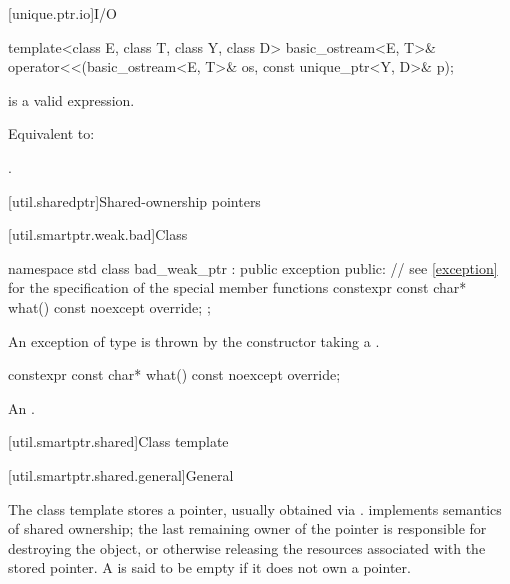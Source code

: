 [unique.ptr.io]{I/O}

%
\begin{itemdecl}
template<class E, class T, class Y, class D>
  basic_ostream<E, T>& operator<<(basic_ostream<E, T>& os, const unique_ptr<Y, D>& p);
\end{itemdecl}

\begin{itemdescr}
\pnum
\constraints
{} is a valid expression.

\pnum
\effects
Equivalent to: 

\pnum
\returns
{}.
\end{itemdescr}

[util.sharedptr]{Shared-ownership pointers}

[util.smartptr.weak.bad]{Class }%
%

%
\begin{codeblock}
namespace std {
  class bad_weak_ptr : public exception {
  public:
    // see \ref{exception} for the specification of the special member functions
    constexpr const char* what() const noexcept override;
  };
}
\end{codeblock}

\pnum
An exception of type  is thrown by the 
constructor taking a .

%
\begin{itemdecl}
constexpr const char* what() const noexcept override;
\end{itemdecl}

\begin{itemdescr}
\pnum
\returns
An  \ntbs{}.
\end{itemdescr}

[util.smartptr.shared]{Class template }

[util.smartptr.shared.general]{General}

\pnum
{}%
The  class template stores a pointer, usually obtained
via .  implements semantics of shared ownership;
the last remaining owner of the pointer is responsible for destroying
the object, or otherwise releasing the resources associated with the stored pointer. A
 is said to be empty if it does not own a pointer.

